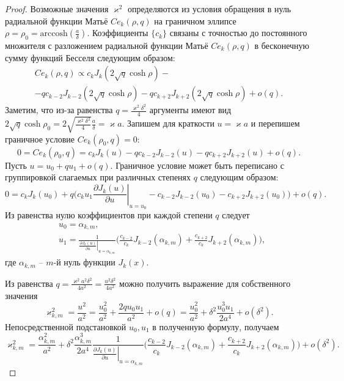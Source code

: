 \begin{proof}
Возможные значения $\varkappa^2$ определяются из условия обращения в нуль радиальной функции Матьё $Ce_k(\rho, q)$ на граничном эллипсе $\rho = \rho_0 = \text{arccosh} (\frac{a}{\delta})$.
Коэффициенты $\{c_k\}$ связаны \cite{wref2} с точностью до постоянного множителя с разложением радиальной функции Матьё $Ce_k(\rho, q)$ в бесконечную сумму функций Бесселя следующим образом:
\begin{multline*}
Ce_k(\rho, q) \propto 
	c_k J_k(2\sqrt{q}\cosh{\rho}) - \\
	- q c_{k-2} J_{k-2}(2\sqrt{q}\cosh{\rho}) -
	q c_{k+2} J_{k+2}(2\sqrt{q}\cosh{\rho}) + o(q).
\end{multline*}
Заметим, что из-за равенства $q = \frac{\varkappa^2\delta^2}{4}$ аргументы имеют вид $2 \sqrt{q} \cosh{\rho_0} = 2 \sqrt{\frac{\varkappa^2 \delta^2}{4}} \frac{a}{\delta} = \varkappa a$. 
Запишем для краткости $u = \varkappa a$ и перепишем граничное условие $Ce_k(\rho_0, q) = 0$:
$$0 = Ce_k(\rho_0, q) =
	c_k J_k(u) 
	- q c_{k-2} J_{k-2}(u) -
	q c_{k+2} J_{k+2}(u) + o(q).$$
Пусть $u = u_0 + q u_1 + o(q)$. Граничное условие может быть переписано с группировкой слагаемых при различных степенях $q$ следующим образом:
$$0 =
	c_k J_k(u_0) + q \biggl(
	c_k u_1 \left.\frac{\partial  J_k(u)}{\partial u}\right|_{u=u_0}
	-  c_{k-2} J_{k-2}(u_0) - c_{k+2} J_{k+2}(u_0) 
	\biggr)+ o(q).$$
Из равенства нулю коэффициентов при каждой степени $q$ следует
\begin{align*}
&u_0 = \alpha_{k, m}, \\
&u_1 = \frac{1}{\left.\frac{\partial J_{k} (u)}{\partial u}\right|_{u=\alpha_{k, m}}} 
\biggl(
\frac{c_{k-2}}{c_k} J_{k-2}(\alpha_{k, m}) + \frac{c_{k+2} }{c_k} J_{k+2}(\alpha_{k, m})
\biggr),
\end{align*}
где $\alpha_{k, m}$ -- $m$-й нуль функции $J_k(x)$.  

Из равенства $q=\frac{\varkappa^2 a^2 \delta^2}{4 a^2}=\frac{u^2 \delta^2}{4a^2}$ можно получить выражение для собственного значения
$$\varkappa_{k, m}^2 = \frac{u^2}{a^2} = \frac{u_0^2}{a^2} + \frac{2 q u_0 u_1}{a^2} + o(q)= \frac{u_0^2}{a^2} +  \delta^2 \frac{u_0^3 u_1}{2 a^4} + o(\delta^2).$$ 
Непосредственной подстановкой $u_0, u_1$ в полученную формулу, получаем
$$\varkappa_{k, m}^2 = 
\frac{\alpha_{k, m}^2}{a^2} +  \delta^2 \frac{\alpha_{k, m}^3}{2 a^4}\frac{1}{\left.\frac{\partial J_{k} (u)}{\partial u}\right|_{u=\alpha_{k, m}}} 
\biggl(
\frac{c_{k-2}}{c_k} J_{k-2}(\alpha_{k, m}) + \frac{c_{k+2} }{c_k} J_{k+2}(\alpha_{k, m})
\biggr) + o(\delta^2).
$$ 
\end{proof}

